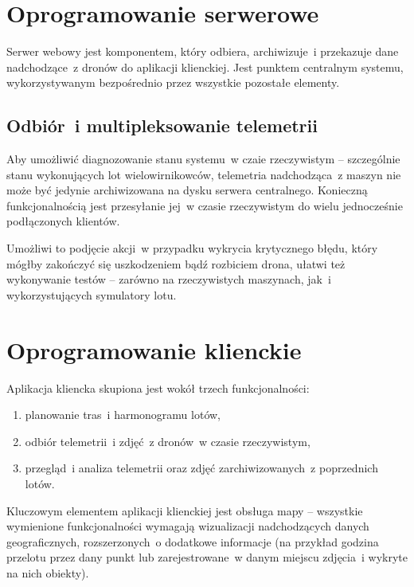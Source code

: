 \section{Oprogramowanie serwerowe}

Serwer webowy jest komponentem, który odbiera, archiwizuje~i przekazuje
dane nadchodzące~z dronów do aplikacji klienckiej. Jest punktem centralnym systemu,
wykorzystywanym bezpośrednio przez wszystkie pozostałe elementy.

\subsection{Odbiór~i multipleksowanie telemetrii}

Aby umożliwić diagnozowanie stanu systemu~w czaie rzeczywistym -- szczególnie
stanu wykonujących lot wielowirnikowców, telemetria nadchodząca~z maszyn nie może być
jedynie archiwizowana na dysku serwera centralnego. Konieczną funkcjonalnością jest
przesyłanie jej~w czasie rzeczywistym do wielu jednocześnie podłączonych klientów.

Umożliwi to podjęcie akcji~w przypadku wykrycia krytycznego błędu, który mógłby
zakończyć się uszkodzeniem bądź rozbiciem drona, ułatwi też wykonywanie testów -- zarówno
na rzeczywistych maszynach, jak~i wykorzystujących symulatory lotu.

\section{Oprogramowanie klienckie}

Aplikacja kliencka skupiona jest wokół trzech funkcjonalności:

\begin{enumerate}
    \item planowanie tras~i harmonogramu lotów,
    \item odbiór telemetrii~i zdjęć~z dronów~w czasie rzeczywistym,
    \item przegląd~i analiza telemetrii oraz zdjęć zarchiwizowanych~z poprzednich lotów.
\end{enumerate}

Kluczowym elementem aplikacji klienckiej jest obsługa mapy -- wszystkie
wymienione funkcjonalności wymagają wizualizacji nadchodzących danych geograficznych,
rozszerzonych~o dodatkowe informacje (na przykład godzina przelotu przez dany punkt lub
zarejestrowane~w danym miejscu zdjęcia~i wykryte na nich obiekty).